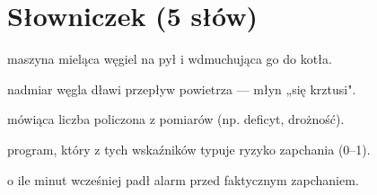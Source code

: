 \documentclass[12pt,a4paper]{article}
\begin{document}
\section*{Słowniczek (5 słów)}
\begin{description}[leftmargin=2.2cm,style=nextline,itemsep=2pt]
  \item[Młyn (MW1--4)] maszyna mieląca węgiel na pył i wdmuchująca go do kotła.
  \item[Zapchanie] nadmiar węgla dławi przepływ powietrza --- młyn „się krztusi".
  \item[Cecha/wskaźnik] mówiąca liczba policzona z pomiarów (np. deficyt, drożność).
  \item[Model] program, który z tych wskaźników typuje ryzyko zapchania (0--1).
  \item[Wyprzedzenie] o ile minut wcześniej padł alarm przed faktycznym zapchaniem.
\end{description}
\end{document}
